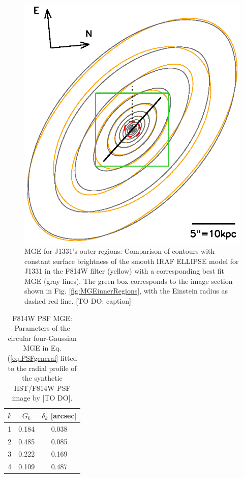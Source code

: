 \begin{figure}
\centering
\includegraphics[width=0.8\columnwidth]{fig/1331F814W_MGE_disk_L.ps}
\caption{MGE for J1331's outer regions: Comparison of contours with constant surface brightness of the smooth IRAF ELLIPSE model for J1331 in the F814W filter (yellow) with a corresponding best fit MGE (gray lines). The green box corresponds to the image section shown in Fig. \ref{fig:MGEinnerRegions}, with the Einstein radius as dashed red line. [TO DO: caption]}
\label{fig:MGEouterRegions}
\end{figure}


\begin{table}
\centering
\caption{F814W PSF MGE: Parameters of the circular four-Gaussian MGE in Eq. (\ref{eq:PSFgeneral} fitted to the radial profile of the synthetic HST/F814W PSF image by [TO DO].}
\begin{tabular}{ccc}
\hline
$k$ & $G_k$ & $\delta_k$ [arcsec] \\\hline
1 & 0.184 & 0.038\\
2 & 0.485 & 0.085\\
3 & 0.222 & 0.169\\
4 & 0.109 & 0.487\\\hline
\end{tabular}
\label{tab:PSFMGEF814W}
\end{table}

